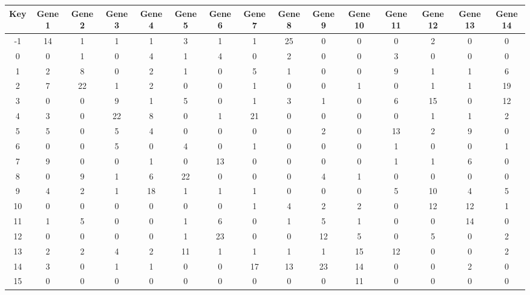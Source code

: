 \begin{tabular}{|c|c|c|c|c|c|c|c|c|c|c|c|c|c|c|}
\hline
Key & Gene 1 & Gene 2 & Gene 3 & Gene 4 & Gene 5 & Gene 6 & Gene 7 & Gene 8 & Gene 9 & Gene 10 & Gene 11 & Gene 12 & Gene 13 & Gene 14 \\
\hline
-1 & 14 & 1 & 1 & 1 & 3 & 1 & 1 & 25 & 0 & 0 & 0 & 2 & 0 & 0 \\
0 & 0 & 1 & 0 & 4 & 1 & 4 & 0 & 2 & 0 & 0 & 3 & 0 & 0 & 0 \\
1 & 2 & 8 & 0 & 2 & 1 & 0 & 5 & 1 & 0 & 0 & 9 & 1 & 1 & 6 \\
2 & 7 & 22 & 1 & 2 & 0 & 0 & 1 & 0 & 0 & 1 & 0 & 1 & 1 & 19 \\
3 & 0 & 0 & 9 & 1 & 5 & 0 & 1 & 3 & 1 & 0 & 6 & 15 & 0 & 12 \\
4 & 3 & 0 & 22 & 8 & 0 & 1 & 21 & 0 & 0 & 0 & 0 & 1 & 1 & 2 \\
5 & 5 & 0 & 5 & 4 & 0 & 0 & 0 & 0 & 2 & 0 & 13 & 2 & 9 & 0 \\
6 & 0 & 0 & 5 & 0 & 4 & 0 & 1 & 0 & 0 & 0 & 1 & 0 & 0 & 1 \\
7 & 9 & 0 & 0 & 1 & 0 & 13 & 0 & 0 & 0 & 0 & 1 & 1 & 6 & 0 \\
8 & 0 & 9 & 1 & 6 & 22 & 0 & 0 & 0 & 4 & 1 & 0 & 0 & 0 & 0 \\
9 & 4 & 2 & 1 & 18 & 1 & 1 & 1 & 0 & 0 & 0 & 5 & 10 & 4 & 5 \\
10 & 0 & 0 & 0 & 0 & 0 & 0 & 1 & 4 & 2 & 2 & 0 & 12 & 12 & 1 \\
11 & 1 & 5 & 0 & 0 & 1 & 6 & 0 & 1 & 5 & 1 & 0 & 0 & 14 & 0 \\
12 & 0 & 0 & 0 & 0 & 1 & 23 & 0 & 0 & 12 & 5 & 0 & 5 & 0 & 2 \\
13 & 2 & 2 & 4 & 2 & 11 & 1 & 1 & 1 & 1 & 15 & 12 & 0 & 0 & 2 \\
14 & 3 & 0 & 1 & 1 & 0 & 0 & 17 & 13 & 23 & 14 & 0 & 0 & 2 & 0 \\
15 & 0 & 0 & 0 & 0 & 0 & 0 & 0 & 0 & 0 & 11 & 0 & 0 & 0 & 0 \\
\hline
\end{tabular}
